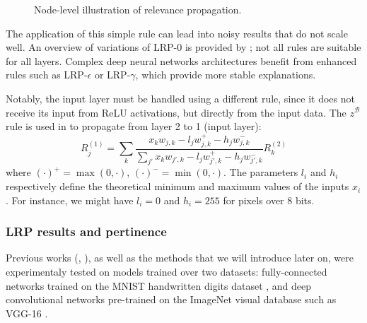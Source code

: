 \documentclass{../cs-classes/cs-classes}
\newcommand*{\1}{\digitsbb{1}}
\newcommand*{\0}{\digitsbb{0}}
\begin{document}
\begin{figure}[H]
    \centering
    \caption{Node-level illustration of relevance propagation.}
\end{figure}

The application of this simple rule can lead into noisy results that do not scale well. An overview of variations of LRP-0 is provided by \cite{montavon-lrp}; not all rules are suitable for all layers. Complex deep neural networks architectures benefit from enhanced rules such as LRP-$\epsilon$ or LRP-$\gamma$, which provide more stable explanations.

Notably, the input layer must be handled using a different rule, since it does not receive its input from ReLU activations, but directly from the input data. The $z^\mathcal{B}$ rule is used in \cite{montavon-lrp} to propagate from layer 2 to 1 (input layer):
\begin{equation}
    R^{(1)}_j = \sum_{k} \frac{x_kw_{j, k} - l_jw^+_{j, k} - h_jw_{j, k}^-}{\sum_{j'}x_kw_{j', k} - l_jw^+_{j', k} - h_jw_{j', k}^-} R^{(2)}_k
\end{equation}
where $(\cdot)^+=\max(0, \cdot)$, $(\cdot)^-=\min(0, \cdot)$. The parameters $l_i$ and $h_i$ respectively define the theoretical minimum and maximum values of the inputs $x_i$. For instance, we might have $l_i=0$ and $h_i=255$ for pixels over 8 bits.

\subsubsection{LRP results and pertinence}
Previous works (\cite{bach-2015}, \cite{montavon-lrp}), as well as the methods that we will introduce later on, were experimentaly tested on models trained over two datasets: fully-connected networks trained on the MNIST handwritten digits dataset \cite{mnist-dataset}, and deep convolutional networks pre-trained on the ImageNet visual database such as VGG-16 \cite{vgg}.
\end{document}
